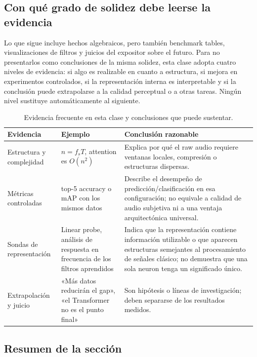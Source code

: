 \documentclass[a4paper]{article}
\begin{document}
\subsection{Con qué grado de solidez debe leerse la evidencia}

Lo que sigue incluye hechos algebraicos, pero también benchmark tables, visualizaciones de filtros y juicios del expositor sobre el futuro. Para no presentarlos como conclusiones de la misma solidez, esta clase adopta cuatro niveles de evidencia: si algo es realizable en cuanto a estructura, si mejora en experimentos controlados, si la representación interna es interpretable y si la conclusión puede extrapolarse a la calidad perceptual o a otras tareas. Ningún nivel sustituye automáticamente al siguiente.

\begin{table}[H]
\centering
\small
\caption{Evidencia frecuente en esta clase y conclusiones que puede sustentar.}
\begin{tabularx}{\textwidth}{L{0.21\textwidth}L{0.29\textwidth}X}
\toprule
Evidencia & Ejemplo & Conclusión razonable \\
\midrule
Estructura y complejidad & $n=f_sT$, attention es $O(n^2)$ & Explica por qué el raw audio requiere ventanas locales, compresión o estructuras dispersas. \\
Métricas controladas & top-5 accuracy o mAP con los mismos datos & Describe el desempeño de predicción/clasificación en esa configuración; no equivale a calidad de audio subjetiva ni a una ventaja arquitectónica universal. \\
Sondas de representación & Linear probe, análisis de respuesta en frecuencia de los filtros aprendidos & Indica que la representación contiene información utilizable o que aparecen estructuras semejantes al procesamiento de señales clásico; no demuestra que una sola neuron tenga un significado único. \\
Extrapolación y juicio & «Más datos reducirán el gap», «el Transformer no es el punto final» & Son hipótesis o líneas de investigación; deben separarse de los resultados medidos. \\
\bottomrule
\end{tabularx}
\end{table}

\subsection{Resumen de la sección}
\end{document}
